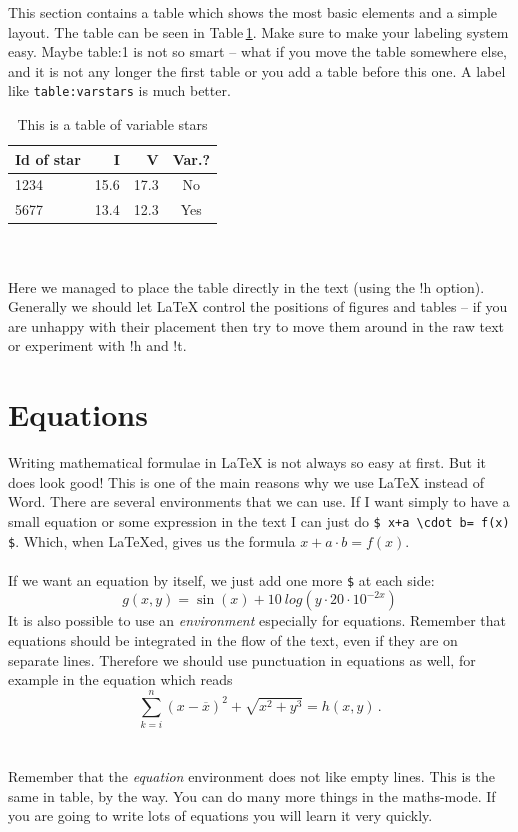 \documentclass[12pt]{report}
\begin{document}
This section contains a table which shows the most basic elements and a simple
layout. The table can be seen in Table\,\ref{table:1}.  Make sure to make your
labeling system easy. Maybe table:1 is not so smart -- what if you move the
table somewhere else, and it is not any longer the first table or you add a
table before this one. A label like {\tt table:varstars} is much better.
\begin{table}[!h]
\caption{This is a table of variable stars}\smallskip
\label{table:1}
\centering  
\begin{tabular}{lrrc}
\hline\hline  
\smallskip
Id of star & I &  V & Var.? \\
\hline
1234 & 15.6 & 17.3 & No \\
5677 & 13.4 & 12.3 & Yes\\
\hline
\end{tabular}
\end{table}
\\ \\
Here we managed to place the table directly in the text (using the !h option).
Generally we should let LaTeX control the positions of figures and tables --
if you are unhappy with their placement then try to move them around in the raw
text or experiment with !h and !t.

\section{Equations}

Writing mathematical formulae in LaTeX is not always so easy at first. But it
does look good! This is one of the main reasons why we use LaTeX instead of
Word. There are several environments that we can use. If I want simply to have
a small equation or some expression in the text I can just do {\tt \$ x+a
\textbackslash cdot b= f(x) \$}. Which, when LaTeXed, gives us the formula $x+a
\cdot b= f(x)$.
\\ \\
If we want an equation by itself, we just add one more {\tt \$} at each side:
$$ g(x,y)=\sin (x) + 10 \ log(y \cdot 20 \cdot 10^{-2x}) $$
It is also possible to use an {\sl environment} especially for equations.
Remember that equations should be integrated in the flow of the text, even if
they are on separate lines. Therefore we should use punctuation in equations as
well, for example in the equation which reads
\begin{equation}
  \sum_{k=i}^n (x- \overline{x})^2 +\sqrt{x^2 + y^3} = h(x,y) \label{eq:smart}
  \, .
\end{equation}
\\ \\
Remember that the {\sl equation} environment does not like empty lines.  This
is the same in table, by the way.  You can do many more things in the
maths-mode. If you are going to write lots of equations you will learn it very
quickly.
\end{document}
